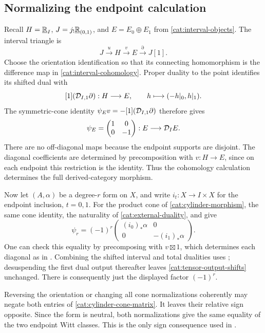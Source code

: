 \subsection{Normalizing the endpoint calculation}

Recall $H=\underline{\mathbb R}_{I}$, $J=j_!\underline{\mathbb R}_{(0,1)}$, and
$E=E_0\oplus E_1$ from \eqref{cat:interval-objects}. The interval
triangle is
\[
 J\xrightarrow{u}H\xrightarrow{v}E\xrightarrow{\partial}J[1].
\]
Choose the
orientation identification so that its connecting homomorphism is
the difference map in \eqref{cat:interval-cohomology}.  Proper duality
to the point identifies its shifted dual with
\[
 [1](\mathcal D_{I,1}\partial):H\longrightarrow E,
 \qquad h\longmapsto(-h|_0,h|_1).
\]
The symmetric-cone identity
$\psi_Ev=-[1](\mathcal D_{I,1}\partial)$ therefore gives
\begin{equation}
 \label{cat:interval-cone-matrix}
 \psi_E=
 \begin{pmatrix}1&0\\0&-1\end{pmatrix}
 :E\longrightarrow\mathcal D_I E.
\end{equation}
There are no off-diagonal maps because the endpoint supports are
disjoint.  The diagonal coefficients are determined by precomposition
with $v:H\to E$, since on each endpoint this restriction is the
identity.  Thus the cohomology calculation determines the full
derived-category morphism.

Now let $(A,\alpha)$ be a degree-$r$ form on $X$, and write
$i_t:X\to I\times X$ for the endpoint inclusion, $t=0,1$.
For the product cone of \eqref{cat:cylinder-morphism}, the same cone
identity, the naturality of \eqref{cat:external-duality}, and
 give
\begin{equation}
 \label{cat:cylinder-cone-matrix}
 \psi_r=(-1)^r
 \begin{pmatrix}(i_0)_*\alpha&0\\0&-(i_1)_*\alpha\end{pmatrix}.
\end{equation}
One can check this equality by precomposing with
$v\boxtimes1$, which determines each diagonal as in
.  Combining the shifted interval and total
dualities uses ; desuspending the first
dual output thereafter leaves \eqref{cat:tensor-output-shifts}
unchanged.  There is consequently just the displayed factor
$(-1)^r$.

Reversing the orientation or changing all cone normalizations
coherently may negate both entries of
\eqref{cat:cylinder-cone-matrix}.  It leaves their relative sign
opposite.  Since the form is neutral, both normalizations give the
same equality of the two endpoint Witt classes.  This is the only
sign consequence used in .
